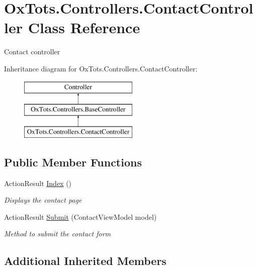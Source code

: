 \hypertarget{class_ox_tots_1_1_controllers_1_1_contact_controller}{}\section{Ox\+Tots.\+Controllers.\+Contact\+Controller Class Reference}
\label{class_ox_tots_1_1_controllers_1_1_contact_controller}


Contact controller  


Inheritance diagram for Ox\+Tots.\+Controllers.\+Contact\+Controller\+:\begin{figure}[H]
\begin{center}
\leavevmode
\includegraphics[height=3.000000cm]{class_ox_tots_1_1_controllers_1_1_contact_controller}
\end{center}
\end{figure}
\subsection*{Public Member Functions}
\begin{DoxyCompactItemize}
\item 
Action\+Result \mbox{\hyperlink{class_ox_tots_1_1_controllers_1_1_contact_controller_a61703dbe4447bcc6186cbfec6c97a3f1}{Index}} ()
\begin{DoxyCompactList}\small\item\em Displays the contact page \end{DoxyCompactList}\item 
Action\+Result \mbox{\hyperlink{class_ox_tots_1_1_controllers_1_1_contact_controller_a82b8a062b1f1002be313a91092911108}{Submit}} (Contact\+View\+Model model)
\begin{DoxyCompactList}\small\item\em Method to submit the contact form \end{DoxyCompactList}\end{DoxyCompactItemize}
\subsection*{Additional Inherited Members}


